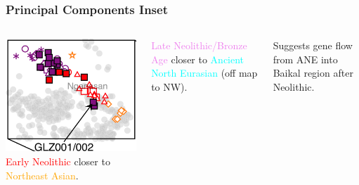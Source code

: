 \documentclass[pdftex,12pt,dvipsnames]{beamer}
\begin{document}
\begin{frame}
  \frametitle{Principal Components Inset}
  \begin{columns}
    \includegraphics[width=1.1\linewidth]{yu20-pca-inset.png}
    \raggedleft
    \textcolor{red}{Early Neolithic} closer to
    \textcolor{orange}{Northeast Asian}.

    \bigskip

    \textcolor{violet}{Late Neolithic/Bronze Age} closer to
    \textcolor{cyan}{Ancient North Eurasian} (off map to NW).

    \bigskip

    Suggests gene flow from ANE into Baikal region after Neolithic.
  \end{columns}
\end{frame}
\end{document}
